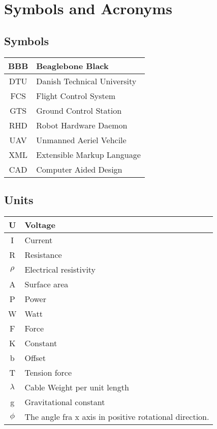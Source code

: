 \chapter{Symbols and Acronyms}
\section{Symbols}
\begin{center}
\begin{tabular}{|c|l|}
\hline
BBB & Beaglebone Black \\ \hline
DTU & Danish Technical University\\ \hline
FCS & Flight Control System \\ \hline
GTS & Ground Control Station \\ \hline
RHD & Robot Hardware Daemon \\ \hline
UAV & Unmanned Aeriel Vehcile \\ \hline
XML & Extensible Markup Language \\ \hline
CAD & Computer Aided Design \\ \hline
\end{tabular}
\end{center}


\section{Units}
\begin{center}
\begin{tabular}{|c|l|}
\hline
U & Voltage \\ \hline
I & Current \\ \hline
R & Resistance \\ \hline
$\rho$ & Electrical resistivity \\ \hline
A & Surface area \\ \hline
P & Power\\ \hline
W & Watt \\ \hline
F & Force \\ \hline
K & Constant \\ \hline
b & Offset \\ \hline
T & Tension force \\ \hline
$\lambda$ & Cable Weight per unit length \\ \hline
g & Gravitational constant \\ \hline
$\phi$ & The angle fra x axis in positive rotational direction.\\ \hline
\end{tabular}
\end{center}
